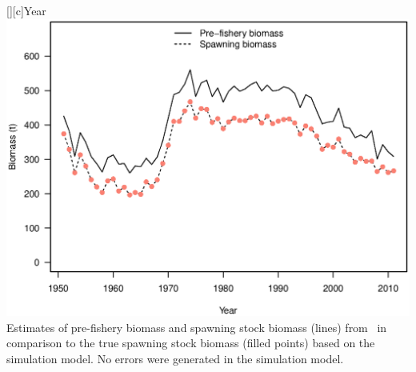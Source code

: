 \begin{multicols}{2}
\begin{figurehere}
	[][c]{Year}
	\includegraphics[width=\columnwidth]{iscamfigs/pHerringFig2.eps}\\
	\caption{Estimates of pre-fishery biomass and spawning stock biomass (lines) from \iscam\  in comparison to the true spawning stock biomass (filled points) based on the simulation model. No errors were generated in the simulation model.}\label{pHerringFig2}
\end{figurehere}



\end{multicols}







